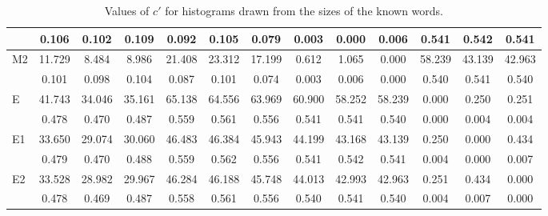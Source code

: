 \begin{table*}[h!]
\begin{center}
\begin{tabular}{| l | c | c | c | c | c | c | c | c | c | c | c | c |}
 & 0.106  & 0.102  & 0.109  & 0.092  & 0.105  & 0.079  & 0.003  & 0.000  & 0.006  & 0.541  & 0.542  & 0.541 \\\hline
M2 & 11.729  & 8.484  & 8.986  & 21.408  & 23.312  & 17.199  & 0.612  & 1.065  & 0.000  & 58.239  & 43.139  & 42.963 \\\hline
 & 0.101  & 0.098  & 0.104  & 0.087  & 0.101  & 0.074  & 0.003  & 0.006  & 0.000  & 0.540  & 0.541  & 0.540 \\\hline
E & 41.743  & 34.046  & 35.161  & 65.138  & 64.556  & 63.969  & 60.900  & 58.252  & 58.239  & 0.000  & 0.250  & 0.251 \\\hline
 & 0.478  & 0.470  & 0.487  & 0.559  & 0.561  & 0.556  & 0.541  & 0.541  & 0.540  & 0.000  & 0.004  & 0.004 \\\hline
E1 & 33.650  & 29.074  & 30.060  & 46.483  & 46.384  & 45.943  & 44.199  & 43.168  & 43.139  & 0.250  & 0.000  & 0.434 \\\hline
 & 0.479  & 0.470  & 0.488  & 0.559  & 0.562  & 0.556  & 0.541  & 0.542  & 0.541  & 0.004  & 0.000  & 0.007 \\\hline
E2 & 33.528  & 28.982  & 29.967  & 46.284  & 46.188  & 45.748  & 44.013  & 42.993  & 42.963  & 0.251  & 0.434  & 0.000 \\\hline
 & 0.478  & 0.469  & 0.487  & 0.558  & 0.561  & 0.556  & 0.540  & 0.541  & 0.540  & 0.004  & 0.007  & 0.000 \\\hline
\end{tabular}
\caption{Values of $c'$ for histograms drawn from the sizes of the known words.}
\end{center}
\end{table*}